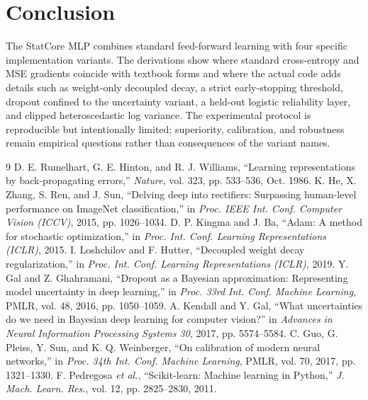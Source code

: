 \documentclass[conference]{IEEEtran}
\begin{document}
\section{Conclusion}
The StatCore MLP combines standard feed-forward learning with four specific implementation variants. The derivations show where standard cross-entropy and MSE gradients coincide with textbook forms and where the actual code adds details such as weight-only decoupled decay, a strict early-stopping threshold, dropout confined to the uncertainty variant, a held-out logistic reliability layer, and clipped heteroscedastic log variance. The experimental protocol is reproducible but intentionally limited; superiority, calibration, and robustness remain empirical questions rather than consequences of the variant names.

\begin{thebibliography}{9}
 D. E. Rumelhart, G. E. Hinton, and R. J. Williams, ``Learning representations by back-propagating errors,'' \emph{Nature}, vol. 323, pp. 533--536, Oct. 1986.
 K. He, X. Zhang, S. Ren, and J. Sun, ``Delving deep into rectifiers: Surpassing human-level performance on ImageNet classification,'' in \emph{Proc. IEEE Int. Conf. Computer Vision (ICCV)}, 2015, pp. 1026--1034.
 D. P. Kingma and J. Ba, ``Adam: A method for stochastic optimization,'' in \emph{Proc. Int. Conf. Learning Representations (ICLR)}, 2015.
 I. Loshchilov and F. Hutter, ``Decoupled weight decay regularization,'' in \emph{Proc. Int. Conf. Learning Representations (ICLR)}, 2019.
 Y. Gal and Z. Ghahramani, ``Dropout as a Bayesian approximation: Representing model uncertainty in deep learning,'' in \emph{Proc. 33rd Int. Conf. Machine Learning}, PMLR, vol. 48, 2016, pp. 1050--1059.
 A. Kendall and Y. Gal, ``What uncertainties do we need in Bayesian deep learning for computer vision?'' in \emph{Advances in Neural Information Processing Systems 30}, 2017, pp. 5574--5584.
 C. Guo, G. Pleiss, Y. Sun, and K. Q. Weinberger, ``On calibration of modern neural networks,'' in \emph{Proc. 34th Int. Conf. Machine Learning}, PMLR, vol. 70, 2017, pp. 1321--1330.
 F. Pedregosa \emph{et al.}, ``Scikit-learn: Machine learning in Python,'' \emph{J. Mach. Learn. Res.}, vol. 12, pp. 2825--2830, 2011.
\end{thebibliography}
\end{document}
